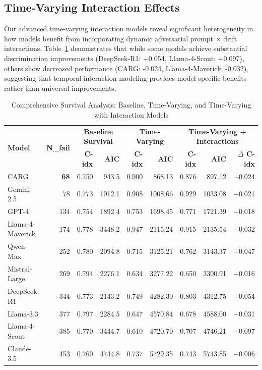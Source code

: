 \documentclass[letterpaper]{article}
\begin{document}
\subsection{Time-Varying Interaction Effects}

Our advanced time-varying interaction models reveal significant heterogeneity in how models benefit from incorporating dynamic adversarial prompt × drift interactions. Table~\ref{tab:time_varying_detailed} demonstrates that while some models achieve substantial discrimination improvements (DeepSeek-R1: +0.054, Llama-4-Scout: +0.097), others show decreased performance (CARG: -0.024, Llama-4-Maverick: -0.032), suggesting that temporal interaction modeling provides model-specific benefits rather than universal improvements.

\begin{table}[t]
  \centering
  {\small
    \setlength{\tabcolsep}{1mm}%
    \begin{tabular}{lrrrrrrrr}
      \toprule
      \multirow{2}{*}{\textbf{Model}} &
      \multirow{2}{*}{\textbf{N\_fail}} &
      \multicolumn{2}{c}{\textbf{Baseline Survival}} &
      \multicolumn{2}{c}{\textbf{Time-Varying}} &
      \multicolumn{3}{c}{\textbf{Time-Varying + Interactions}} \\
      \cmidrule(lr){3-4} \cmidrule(lr){5-6} \cmidrule(lr){7-9}
      & & \textbf{C-idx} & \textbf{AIC} & \textbf{C-idx} & \textbf{AIC}
        & \textbf{C-idx} & \textbf{AIC} & \textbf{$\Delta$ C-idx} \\
      \midrule
      CARG               & \textbf{68}  & 0.750 &  943.5 & 0.900 &  868.13 & 0.876 &  897.12 & –0.024 \\
      Gemini-2.5         & 78           & 0.773 & 1012.1 & 0.908 & 1008.66 & 0.929 & 1033.08 & +0.021 \\
      GPT-4              & 134          & 0.754 & 1892.4 & 0.753 & 1698.45 & 0.771 & 1721.39 & +0.018 \\
      Llama-4-Maverick   & 174          & 0.778 & 3448.2 & 0.947 & 2115.24 & 0.915 & 2135.54 & –0.032 \\
      Qwen-Max           & 252          & 0.780 & 2094.8 & 0.715 & 3125.21 & 0.762 & 3143.37 & +0.047 \\
      Mistral-Large      & 269          & 0.794 & 2276.1 & 0.634 & 3277.22 & 0.650 & 3300.91 & +0.016 \\
      DeepSeek-R1        & 344          & 0.773 & 2143.2 & 0.749 & 4282.30 & 0.803 & 4312.75 & +0.054 \\
      Llama-3.3          & 377          & 0.797 & 2284.5 & 0.647 & 4570.84 & 0.678 & 4588.00 & +0.031 \\
      Llama-4-Scout      & 385          & 0.770 & 3444.7 & 0.610 & 4720.70 & 0.707 & 4746.21 & +0.097 \\
      Claude-3.5         & 453          & 0.760 & 4744.8 & 0.737 & 5729.35 & 0.743 & 5743.85 & +0.006 \\
      \bottomrule
    \end{tabular}
  }
  \caption{Comprehensive Survival Analysis: Baseline, Time-Varying, and Time-Varying with Interaction Models}
  \label{tab:time_varying_detailed}
\end{table}
\end{document}
